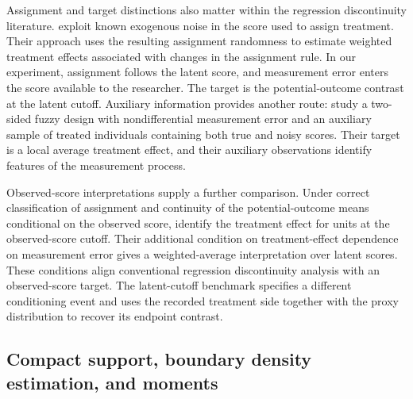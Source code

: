 \documentclass[11pt]{article}
\begin{document}
Assignment and target distinctions also matter within the regression discontinuity literature. \citet{Eckles2025} exploit known exogenous noise in the score used to assign treatment. Their approach uses the resulting assignment randomness to estimate weighted treatment effects associated with changes in the assignment rule. In our experiment, assignment follows the latent score, and measurement error enters the score available to the researcher. The target is the potential-outcome contrast at the latent cutoff. Auxiliary information provides another route: \citet{DaveziesLeBarbanchon2017ContinuousError} study a two-sided fuzzy design with nondifferential measurement error and an auxiliary sample of treated individuals containing both true and noisy scores. Their target is a local average treatment effect, and their auxiliary observations identify features of the measurement process.

Observed-score interpretations supply a further comparison. Under correct classification of assignment and continuity of the potential-outcome means conditional on the observed score, \citet[Section~2.1, Lemma~2.1]{DongKolesar2023IgnoreMeasurementError} identify the treatment effect for units at the observed-score cutoff. Their additional condition on treatment-effect dependence on measurement error gives a weighted-average interpretation over latent scores. These conditions align conventional regression discontinuity analysis with an observed-score target. The latent-cutoff benchmark specifies a different conditioning event and uses the recorded treatment side together with the proxy distribution to recover its endpoint contrast.

\subsection{Compact support, boundary density estimation, and moments}
\end{document}
